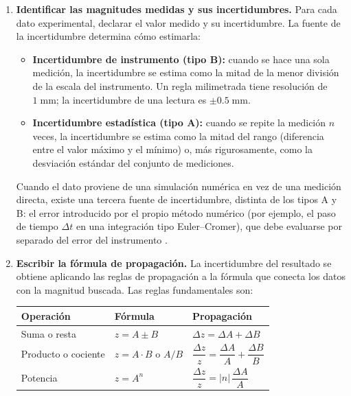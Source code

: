 \documentclass[11pt]{book}
\begin{document}
\begin{enumerate}
    \item[1.] {\bf Identificar las magnitudes medidas y sus incertidumbres.} Para cada dato experimental, declarar el valor medido y su incertidumbre. La fuente de la incertidumbre determina cómo estimarla:
    \begin{itemize}
        \item {\bf Incertidumbre de instrumento (tipo B):} cuando se hace una sola medición, la incertidumbre se estima como la mitad de la menor división de la escala del instrumento. Un regla milimetrada tiene resolución de $1\;\text{mm}$; la incertidumbre de una lectura es $\pm 0.5\;\text{mm}$.
        \item {\bf Incertidumbre estadística (tipo A):} cuando se repite la medición $n$ veces, la incertidumbre se estima como la mitad del rango (diferencia entre el valor máximo y el mínimo) o, más rigurosamente, como la desviación estándar del conjunto de mediciones.
    \end{itemize}

    Cuando el dato proviene de una simulación numérica en vez de una medición directa, existe una tercera fuente de incertidumbre, distinta de los tipos A y B: el error introducido por el propio método numérico (por ejemplo, el paso de tiempo $\Delta t$ en una integración tipo Euler--Cromer), que debe evaluarse por separado del error del instrumento \cite{MaltheSorenssen2015}.

    \item[2.] {\bf Escribir la fórmula de propagación.} La incertidumbre del resultado se obtiene aplicando las reglas de propagación a la fórmula que conecta los datos con la magnitud buscada. Las reglas fundamentales son:

    \medskip
    \begin{center}
    \small
    \begin{tabular}{lll}
    \hline
    \textbf{Operación} & \textbf{Fórmula} & \textbf{Propagación} \\
    \hline
    Suma o resta      & $z = A \pm B$           & $\Delta z = \Delta A + \Delta B$ \\
    Producto o cociente & $z = A \cdot B$ o $A/B$ & $\dfrac{\Delta z}{z} = \dfrac{\Delta A}{A} + \dfrac{\Delta B}{B}$ \\[4pt]
    Potencia          & $z = A^n$               & $\dfrac{\Delta z}{z} = |n|\,\dfrac{\Delta A}{A}$ \\[4pt]
    \hline
    \end{tabular}
    \end{center}


\end{enumerate}
\end{document}

